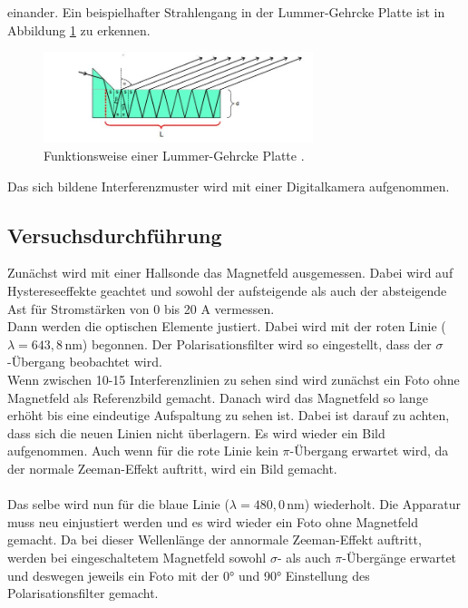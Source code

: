 einander.
Ein beispielhafter Strahlengang in der Lummer-Gehrcke Platte ist in Abbildung \ref{fig:Gehrcke} zu erkennen.
\begin{figure}[H]
  \centering
  \includegraphics[width=0.7\textwidth]{pics/Lena-Gehrcke.JPG}
  \caption{Funktionsweise einer Lummer-Gehrcke Platte \cite{Anleitung}.}
  \label{fig:Gehrcke}
\end{figure}
Das sich bildene Interferenzmuster wird mit einer Digitalkamera aufgenommen.
\subsection{Versuchsdurchführung}
Zunächst wird mit einer Hallsonde das Magnetfeld ausgemessen. Dabei wird auf Hystereseeffekte geachtet und
sowohl der aufsteigende als auch der absteigende Ast für Stromstärken von 0 bis 20 A vermessen.\\
Dann werden die optischen Elemente justiert. Dabei wird mit der roten Linie ($\lambda = 643,8\,$nm)
begonnen. Der Polarisationsfilter wird so eingestellt, dass der $\sigma$-Übergang beobachtet wird.\\
Wenn zwischen 10-15 Interferenzlinien zu sehen sind wird zunächst ein Foto ohne Magnetfeld als Referenzbild gemacht.
Danach wird das Magnetfeld so lange erhöht bis eine eindeutige Aufspaltung zu sehen ist. Dabei ist darauf zu achten,
dass sich die neuen Linien nicht überlagern. Es wird wieder ein Bild aufgenommen. Auch wenn für die rote Linie
kein $\pi$-Übergang erwartet wird, da der normale Zeeman-Effekt auftritt, wird ein Bild gemacht.\\
\\Das selbe wird nun für die blaue Linie ($\lambda = 480,0\,$nm) wiederholt. Die Apparatur muss neu einjustiert werden
und es wird wieder ein Foto ohne Magnetfeld gemacht. Da bei dieser Wellenlänge der annormale Zeeman-Effekt auftritt, werden
bei eingeschaltetem Magnetfeld sowohl $\sigma$- als auch $\pi$-Übergänge erwartet und deswegen jeweils ein Foto mit
der 0° und 90° Einstellung des Polarisationsfilter gemacht.
